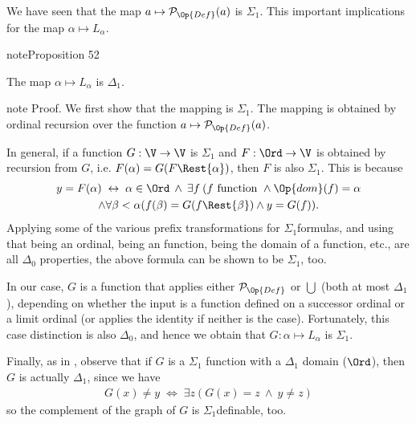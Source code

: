 \documentclass[letterpaper,10pt,english]{jupyterBook}
\begin{document}
\sphinxAtStartPar
We have seen that the map \(a \mapsto \mathcal{P}_{\Op{Def}}(a)\) is \(\Sigma_1\). This important implications for the map \(\alpha \mapsto L_\alpha\).
\label{V=L:prop-map-Lalpha}
\begin{sphinxadmonition}{note}{Proposition 52}



\sphinxAtStartPar
The map \(\alpha \mapsto L_\alpha\) is \(\Delta_1\).
\end{sphinxadmonition}

\begin{sphinxadmonition}{note}
\sphinxAtStartPar
Proof. We first show that the mapping is \(\Sigma_1\). The mapping is obtained by ordinal recursion over the function \(a \mapsto \mathcal{P}_{\Op{Def}}(a)\).

\sphinxAtStartPar
In general, if a function \(G: \V \to \V\) is \(\Sigma_1\) and \(F: \Ord \to \V\) is obtained by recursion from \(G\), i.e. \(F(\alpha) = G(F\Rest{\alpha})\), then \(F\) is also \(\Sigma_1\). This is because
\begin{multline*}
    y= F(\alpha) \; \leftrightarrow \; \alpha \in \Ord \: \wedge \: \exists f \: ( f \text{ function } \wedge \Op{dom}(f) = \alpha \\
        \wedge \forall \beta < \alpha (f(\beta) = G(f \Rest{\beta}) \wedge y = G(f)).
\end{multline*}
\sphinxAtStartPar
Applying some of the various prefix transformations for \(\Sigma_1\)\sphinxhyphen{}formulas, and using that being an ordinal, being an function, being the domain of a function, etc., are all \(\Delta_0\) properties, the above formula can be shown to be \(\Sigma_1\), too.

\sphinxAtStartPar
In our case, \(G\) is a function that applies either \(\mathcal{P}_{\Op{Def}}\) or \(\bigcup\) (both at most \(\Delta_1\)), depending on whether the input is a function defined on a successor ordinal or a limit ordinal (or applies the identity if neither is the case). Fortunately, this case distinction is also \(\Delta_0\), and hence we obtain that \(G: \alpha \mapsto L_\alpha\) is \(\Sigma_1\).

\sphinxAtStartPar
Finally, as in {\hyperref[\detokenize{constructible:thm-definability-Pdef}]{}}, observe that if \(G\) is a \(\Sigma_1\) function with a \(\Delta_1\) domain (\(\Ord\)), then \(G\) is actually \(\Delta_1\), since we have
\begin{equation*}
\begin{split}
	G(x) \neq y \; \Leftrightarrow \; \exists z (G(x)=z \: \wedge \: y \neq z)
\end{split}
\end{equation*}
\sphinxAtStartPar
so the complement of the graph of \(G\) is \(\Sigma_1\)\sphinxhyphen{}definable, too.
\end{sphinxadmonition}
\end{document}
